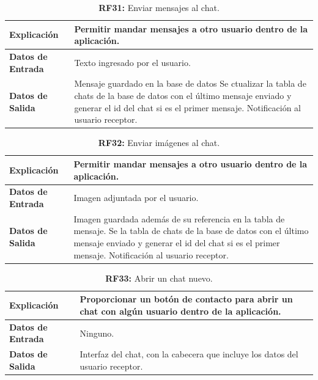 \documentclass[a4paper, 12pt]{article}
\begin{document}
\begin{table}[H]
\captionsetup{justification=raggedright,singlelinecheck=false}
\caption{\textbf{RF31:} Enviar mensajes al chat.}
\label{tab:RF31}
	\begin{tabular}{|m{5cm}|m{10cm}|}
	\hline
	\textbf{Explicación} & Permitir mandar mensajes a otro usuario dentro de la aplicación. \\ 
	\hline
	\textbf{Datos de Entrada} & Texto ingresado por el usuario. \\ 
	\hline
	\textbf{Datos de Salida} & Mensaje guardado en la base de datos Se ctualizar la tabla de chats de la base de datos con el último mensaje enviado y generar el id del chat si es el primer mensaje. Notificación al usuario receptor. \\ 
	\hline
\end{tabular}
\end{table}


\begin{table}[H]
\captionsetup{justification=raggedright,singlelinecheck=false}
\caption{\textbf{RF32:} Enviar imágenes al chat.}
\label{tab:RF32}
	\begin{tabular}{|m{5cm}|m{10cm}|}
\hline
	\textbf{Explicación} & Permitir mandar mensajes a otro usuario dentro de la aplicación. \\ 
	\hline
	\textbf{Datos de Entrada} & Imagen adjuntada por el usuario. \\ 
	\hline
	\textbf{Datos de Salida} & Imagen guardada además de su referencia en la tabla de mensaje. Se la tabla de chats de la base de datos con el último mensaje enviado y generar el id del chat si es el primer mensaje. Notificación al usuario receptor. \\ 
	\hline
\end{tabular}
\end{table}


\begin{table}[H]
\captionsetup{justification=raggedright,singlelinecheck=false}
\caption{\textbf{RF33:} Abrir un chat nuevo.}
\label{tab:RF33}
	\begin{tabular}{|m{5cm}|m{10cm}|}
	\hline
	\textbf{Explicación} & Proporcionar un botón de contacto para abrir un chat con algún usuario dentro de la aplicación. \\ 
	\hline
	\textbf{Datos de Entrada} & Ninguno. \\ 
	\hline
	\textbf{Datos de Salida} & Interfaz del chat, con la cabecera que incluye los datos del usuario receptor. \\ 
	\hline
\end{tabular}
\end{table}
\end{document}
